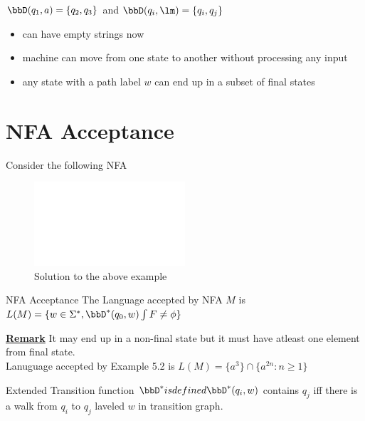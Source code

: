 \begin{example}
    $\bbD (q_1, a) = \{q_2, q_3\} $ and $\bbD(q_i, \lm) = \{q_i, q_j\} $
\end{example}

\begin{itemize}
    \item can have empty strings now
    \item machine can move from one state to another without processing any input
    \item any state with a path label $w$ can end up in a subset of final states 
\end{itemize}

\section{NFA Acceptance}

\begin{example}
    Consider the following NFA
\end{example}

\begin{figure}[!h]
    \centering
    \includegraphics[width=0.5\textwidth]{figures/default.png}
    \caption{Solution to the above example}
\end{figure}

\begin{definition}{NFA Acceptance}
    The Language accepted by NFA $M$ is $L(M) = \{w \in \Sigma^{*}, \bbD^{*}(q_0, w) \int  F \neq \phi \} $
\end{definition}

\textbf{\underline{Remark}} It may end up in a non-final state but it must have atleast one element from final state. \\ 

Lanuguage accepted by Example 5.2 is $L(M) = \{a^3\} \cap \{a^{2n} : n \geq 1\} $

\begin{definition}{Extended Transition function}
    $\bbD^{*} is defined \bbD^{*}(q_i, w)$ contains $q_j$ iff there is a walk from $q_i$ to $q_j$ laveled $w$ in transition graph. 
\end{definition}

